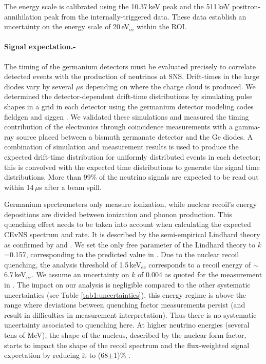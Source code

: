 \documentclass[aps,prltightenlines,superscriptaddress,nofootinbib,amsmath,amssymb,reprint]{revtex4-2}
\begin{document}
The energy scale is calibrated using the 10.37\,keV  peak and the 511\,keV positron-annihilation peak from the internally-triggered data. These data establish an uncertainty on the energy scale of 20\,eV$_{\textrm{ee}}$ within the ROI.

\paragraph*{Signal expectation.-} The timing of the germanium detectors must be evaluated precisely to correlate detected events with the production of neutrinos at SNS.
Drift-times in the large diodes vary by several $\mu$s depending on where the charge cloud is produced.
We determined the detector-dependent drift-time distributions by simulating pulse shapes in a grid in each detector using the germanium detector modeling codes fieldgen and siggen \cite{Radford2014}.
We validated these simulations and measured the timing contribution of the electronics through coincidence measurements with a gamma-ray source placed between a bismuth germanate detector and the Ge diodes. 
A combination of simulation and measurement results is used to produce the expected drift-time distribution for uniformly distributed events in each detector; this is convolved with the expected time distributions to generate the signal time distributions.
More than 99\% of the neutrino signals are expected to be read out within 14\,$\mu$s after a beam spill. 


Germanium spectrometers only measure ionization, while nuclear recoil's energy depositions are divided between ionization and phonon production.  
This quenching effect needs to be taken into account when calculating the expected CEvNS spectrum and rate. It is described by the semi-empirical Lindhard theory \cite{Lindhard1963} as confirmed by \cite{bonhomme2022direct} and \cite{li2022measurement}. We set the only free parameter of the Lindhard theory to $k$=0.157, corresponding to the predicted value in \cite{Lindhard1963}. Due to the nuclear recoil quenching, the analysis threshold of 1.5\,keV$_{\textrm{ee}}$ corresponds to a recoil energy of $\sim$6.7\,keV$_{nr}$.
We assume an uncertainty on $k$ of 0.004 as 
quoted for the measurement in \cite{bonhomme2022direct}. The impact on our analysis is negligible compared to the other systematic uncertainties (see Table \ref{tab1:uncertainties}), this energy regime is above the range where deviations between quenching factor measurements persist \cite{bonhomme2022direct, li2022measurement, collar2021germanium} (and result in difficulties in measurement interpretation). Thus there is no systematic uncertainty associated to quenching here.
At higher neutrino energies (several tens of MeV), the shape of the nucleus, described by the nuclear form factor, starts to impact the shape of the recoil spectrum and the flux-weighted signal expectation by reducing it to (68$\pm$1)\% \cite{helm1956inelastic,klein1999exclusive}.
\end{document}
